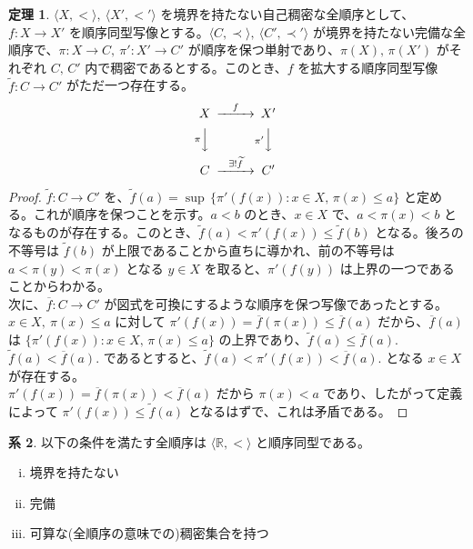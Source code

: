 \documentclass{jsarticle}
\theoremstyle{definition}
\newtheorem{theorem}{定理}[section]
\newtheorem{corollary}[theorem]{系}
\begin{document}
    \begin{theorem}
        $\langle X, < \rangle, \ \langle X', <' \rangle$ を境界を持たない自己稠密な全順序として、$f : X \rightarrow X'$ を順序同型写像とする。$\langle C, \prec \rangle, \ \langle C', \prec' \rangle$ が境界を持たない完備な全順序で、$\pi : X \rightarrow C, \ \pi' : X' \rightarrow C'$ が順序を保つ単射であり、$\pi(X), \, \pi(X')$ がそれぞれ $C, \, C'$ 内で稠密であるとする。このとき、$f$ を拡大する順序同型写像 $\widetilde{f} : C \rightarrow C'$ がただ一つ存在する。
        \[
          \begin{CD}
             X @>{f}>> X' \\
          @V{\pi}VV    @V{\pi'}VV \\
             C   @>{\exists!\widetilde{f}}>>  C'
          \end{CD}
        \]
    \end{theorem}
    \begin{proof}
        $\widetilde{f} : C \rightarrow C'$ を、$\widetilde{f}(a) = \sup \, \{ \pi'(f(x)) : x \in X, \, \pi(x) \leq a \}$ と定める。これが順序を保つことを示す。$a < b$ のとき、$x \in X$ で、$a < \pi(x) < b$ となるものが存在する。このとき、$\widetilde{f}(a) < \pi'(f(x)) \leq \widetilde{f}(b)$ となる。後ろの不等号は $\widetilde{f}(b)$ が上限であることから直ちに導かれ、前の不等号は $a < \pi(y) < \pi(x)$ となる $y \in X$ を取ると、$\pi'(f(y))$ は上界の一つであることからわかる。\\
        次に、$\overline{f} : C \rightarrow C'$ が図式を可換にするような順序を保つ写像であったとする。\\
        $x \in X, \ \pi(x) \leq a$ に対して $\pi'(f(x)) = \overline{f}(\pi(x)) \leq \overline{f}(a)$ だから、$\overline{f}(a)$ は $\{ \pi'(f(x)) : x \in X, \, \pi(x) \leq a \}$ の上界であり、$\widetilde{f}(a) \leq \overline{f}(a).$\\
        $\widetilde{f}(a) < \overline{f}(a).$ であるとすると、$\widetilde{f}(a) < \pi'(f(x)) <  \overline{f}(a).$ となる $x \in X$ が存在する。\\
        $\pi'(f(x)) = \overline{f}(\pi(x)) < \overline{f}(a)$ だから $\pi(x) < a$ であり、したがって定義によって $\pi'(f(x)) \leq \widetilde{f}(a)$ となるはずで、これは矛盾である。
    \end{proof}
    
    \begin{corollary}
        以下の条件を満たす全順序は $\langle \mathbb{R}, < \rangle$ と順序同型である。
        \begin{enumerate}[(i)]
            \item 境界を持たない
            \item 完備
            \item 可算な(全順序の意味での)稠密集合を持つ
        \end{enumerate}
    \end{corollary}
    
\end{document}
